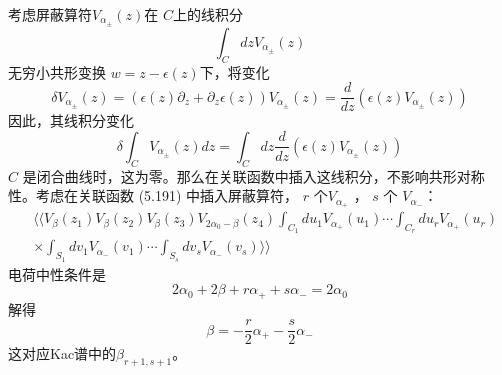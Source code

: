 考虑屏蔽算符$ V_{\alpha_{\pm}}(z) $在 $C $上的线积分
\begin{equation}
	\int_{C} d z V_{\alpha_{\pm}}(z) 
\end{equation}
无穷小共形变换 $w=z-\epsilon(z) $下，将变化
\begin{equation}
	\delta V_{\alpha_{\pm}}(z)=\left(\epsilon(z) \partial_{z}+\partial_{z} \epsilon(z)\right) V_{\alpha_{\pm}}(z)=\frac{d}{d z}\left(\epsilon(z) V_{\alpha_{\pm}}(z)\right)
\end{equation} 
因此，其线积分变化
\begin{equation}
    \delta\int_{C}  V_{\alpha_{\pm}}(z) d z=\int_{C} dz\frac{d}{d z}\left(\epsilon(z) V_{\alpha_{\pm}}(z)\right)
\end{equation}
$C$ 是闭合曲线时，这为零。那么在关联函数中插入这线积分，不影响共形对称性。考虑在关联函数 (5.191) 中插入屏蔽算符， $r$ 个$ V_{\alpha_{+}}$ ， $s$ 个 $V_{\alpha_{-}} $：
\begin{equation}
\begin{aligned} & \langle \langle V_{\beta}\left(z_{1}\right) V_{\beta}\left(z_{2}\right) V_{\beta}\left(z_{3}\right) V_{2 \alpha_{0}-\beta}\left(z_{4}\right) \int_{C_{1}} d u_{1} V_{\alpha_{+}}\left(u_{1}\right) \cdots \int_{C_{r}} d u_{r} V_{\alpha_{+}}\left(u_{r}\right)\\&\times \int_{S_{1}} d v_{1} V_{\alpha_{-}}\left(v_{1}\right) \cdots \int_{S_{s}} d v_{s} V_{\alpha_{-}}\left(v_{s}\right) \rangle \rangle \end{aligned}
\end{equation} 
电荷中性条件是
\begin{equation}
	2 \alpha_{0}+2 \beta+r \alpha_{+}+s \alpha_{-}=2 \alpha_{0}
\end{equation} 
解得
\begin{equation}
	\beta=-\frac{r}{2} \alpha_{+}-\frac{s}{2} \alpha_{-} 
\end{equation}
这对应Kac谱中的$ \beta_{r+1, s+1} $。

